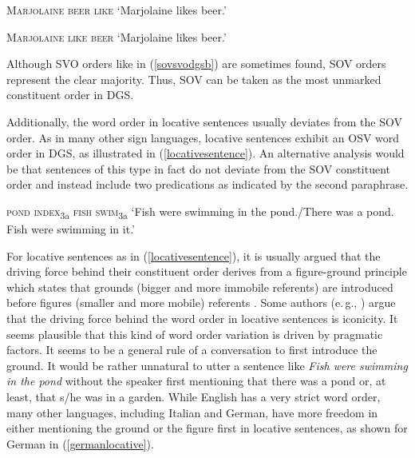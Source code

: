 \begin{exe}
\ex\label{sovsvodgsa}
\textsc{Marjolaine beer like}
\glt `Marjolaine likes beer.'\label{sovsvodgsaaba}
\end{exe}

\begin{exe}
\ex\label{sovsvodgsb}
\textsc{Marjolaine like beer}
\glt `Marjolaine likes beer.'
\end{exe}


\noindent Although SVO orders like in (\ref{sovsvodgsb}) are sometimes found, SOV orders represent the clear majority. Thus, SOV can be taken as the most unmarked constituent order in DGS.%

Additionally, the word order in locative sentences usually deviates from the SOV order. As in many other sign languages, locative sentences exhibit an OSV word order in DGS, as illustrated in (\ref{locativesentence}). An alternative analysis would be that sentences of this type in fact do not deviate from the SOV constituent order and instead include two predications as indicated by the second paraphrase. 

\begin{exe}
\ex \textsc{pond index}\textsubscript{3a} \textsc{fish swim}\textsubscript{3a}
\glt `Fish were swimming in the pond./There was a pond. Fish were swimming in it.' \label{locativesentence}
\end{exe}

\noindent For locative sentences as in (\ref{locativesentence}), it is usually argued that the driving force behind their constituent order derives from a figure-ground principle which states that grounds (bigger and more immobile referents) are introduced before figures (smaller and more mobile) referents \citep{volterra1984italian,kimmelman2012word,pfau2016simple}. Some authors (e.\,g., \citealt{perniss2007space, ozyurek2010locative}) argue that the driving force behind the word order in locative sentences is iconicity. It seems plausible that this kind of word order variation is driven by pragmatic factors. It seems to be a general rule of a conversation to first introduce the ground. It would be rather unnatural to utter a sentence like \textit{Fish were swimming in the pond} without the speaker first mentioning that there was a pond or, at least, that s/he was in a garden. While English has a very strict word order, many other languages, including Italian and German, have more freedom in either mentioning the ground or the figure first in locative sentences, as shown for German in (\ref{germanlocative}).

